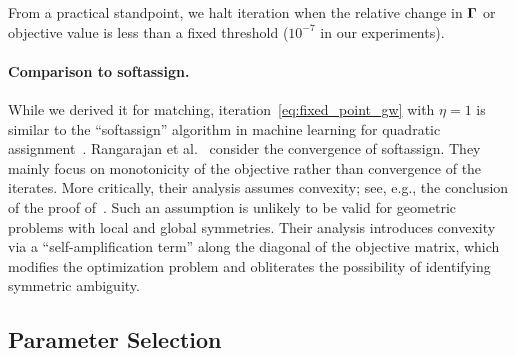 From a practical standpoint, we halt \GWa iteration when the relative change in $\mathbf \Gamma$ or objective value is less than a fixed threshold ($10^{-7}$ in our experiments).

\paragraph*{Comparison to softassign.}  While we derived it for \GWa matching, iteration~\eqref{eq:fixed_point_gw} with $\eta=1$ is similar to the ``softassign'' algorithm in machine learning for quadratic assignment~\cite{gold-1996,rangarajan-1996}.  %
Rangarajan et al.~ consider the convergence of softassign.  They mainly focus on monotonicity of the objective rather than convergence of the iterates.  More critically, their analysis assumes convexity; see, e.g., the conclusion of the proof of~\cite[Theorem 1]{rangarajan-1999}.  Such an assumption is unlikely to be valid for geometric problems with local and global symmetries.  Their analysis introduces convexity via a ``self-amplification term'' along the diagonal of the objective matrix, which modifies the optimization problem and obliterates the possibility of identifying symmetric ambiguity.

\subsection{Parameter Selection}


